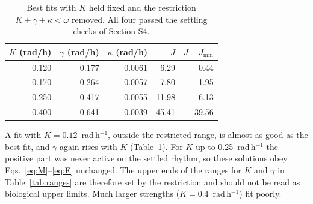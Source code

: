 \documentclass[10pt,a4paper]{article}
\begin{document}
\begin{table}[!htb]
\centering\small
\begin{tabular}{rrrrr}
\toprule
$K$ (rad/h) & $\gamma$ (rad/h) & $\kappa$ (rad/h) & $J$ & $J-J_{\min}$\\
\midrule
0.120 & 0.177 & 0.0061 & 6.29 & 0.44\\
0.170 & 0.264 & 0.0057 & 7.80 & 1.95\\
0.250 & 0.417 & 0.0055 & 11.98 & 6.13\\
0.400 & 0.641 & 0.0039 & 45.41 & 39.56\\
\bottomrule
\end{tabular}
\caption{Best fits with $K$ held fixed and the restriction
$K+\gamma+\kappa<\omega$ removed. All four passed the settling checks of
Section S4.}
\label{tab:domain}
\end{table}

A fit with $K=0.12$~rad\,h$^{-1}$, outside the restricted range, is
almost as good as the best fit, and $\gamma$ again rises with $K$
(Table~\ref{tab:domain}). For $K$ up to 0.25~rad\,h$^{-1}$ the positive
part was never active on the settled rhythm, so these solutions obey
Eqs.~\eqref{eq:M}--\eqref{eq:E} unchanged. The upper ends of the ranges for $K$ and $\gamma$ in
Table~\ref{tab:ranges} are therefore set by the restriction and should
not be read as biological upper limits. Much larger strengths
($K=0.4$~rad\,h$^{-1}$) fit poorly.
\end{document}
